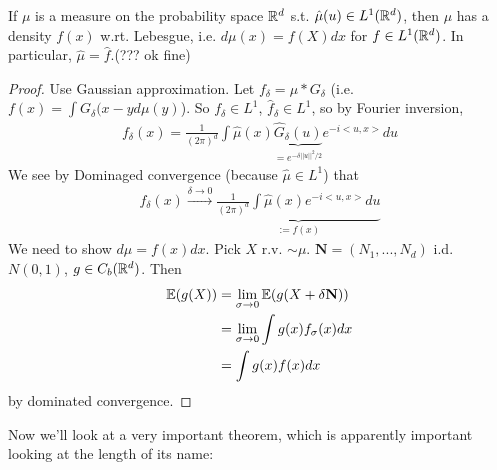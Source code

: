 \documentclass[a4paper]{article}
\begin{document}
\begin{prop}
If $\mu$ is a measure on the probability space $\mathbb{R}^d$ s.t. $\hat{\mu} (u) \in L^1 (\mathbb{R}^d)$, then $\mu$ has a density $f(x)$ w.rt. Lebesgue, i.e. $d\mu(x) = f(X) dx$ for $f \in L^1(\mathbb{R}^d)$. In particular, $\hat{\mu} = \hat{f}$.(??? ok fine)
\begin{proof}
Use Gaussian approximation. Let $f_\delta = \mu * G_\delta$ (i.e. $f(x) = \int G_\delta(x-y d\mu(y)$). So $f_\delta \in L^1$, $\hat{f}_\delta \in L^1$, so by Fourier inversion,
\begin{equation*}
\begin{aligned}
f_\delta(x) = \frac{1}{(2\pi)^d} \int \hat{\mu}(x) \underbrace{\hat{G}_\delta (u)}_{=e^{-\delta||u||^2/2}} e^{-i<u,x>}du
\end{aligned}
\end{equation*}
We see by Dominaged convergence (because $\hat{\mu} \in L^1$) that 
\begin{equation*}
\begin{aligned}
f_\delta(x) \xrightarrow{\delta \to 0} \underbrace{\frac{1}{(2\pi)^d} \int \hat{\mu} (x) e^{-i<u,x>} du}_{:=f(x)}
\end{aligned}
\end{equation*}
We need to show $d\mu = f(x)dx$. Pick $X$ r.v. $\sim \mu$. $\mathbf{N} = (N_1,...,N_d)$ i.d. $N(0,1)$, $g \in C_b (\mathbb{R}^d)$. Then
\begin{equation*}
\begin{aligned}
\mathbb{E}(g(X)) &= \lim_{\sigma \to 0} \mathbb{E}(g(X+\delta\mathbf{N}))\\
&= \lim_{\sigma \to 0} \int g(x) f_\sigma(x) dx\\
&= \int g(x) f(x) dx
\end{aligned}
\end{equation*}
by dominated convergence.
\end{proof}
\end{prop}

Now we'll look at a very important theorem, which is apparently important looking at the length of its name:
\end{document}
